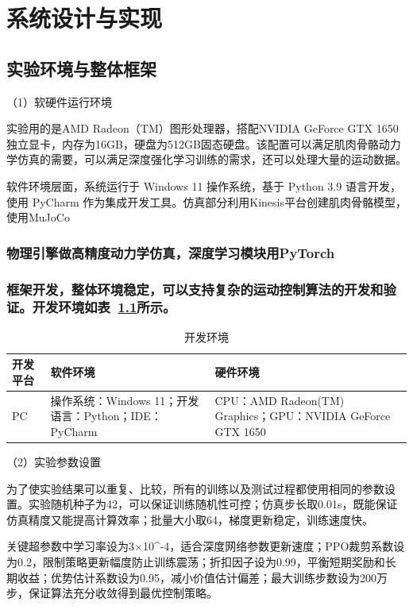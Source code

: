 
\chapter{系统设计与实现}\label{ux7cfbux7edfux8bbeux8ba1ux4e0eux5b9eux73b0}

\section{实验环境与整体框架}\label{ux5b9eux9a8cux73afux5883ux4e0eux6574ux4f53ux6846ux67b6}

（1）软硬件运行环境

实验用的是AMD Radeon（TM）图形处理器，搭配NVIDIA GeForce GTX
1650独立显卡，内存为16GB，硬盘为512GB固态硬盘。该配置可以满足肌肉骨骼动力学仿真的需要，可以满足深度强化学习训练的需求，还可以处理大量的运动数据。

软件环境层面，系统运行于 Windows 11 操作系统，基于 Python 3.9
语言开发，使用 PyCharm
作为集成开发工具。仿真部分利用Kinesis平台创建肌肉骨骼模型，使用MuJoCo
\subsection{物理引擎做高精度动力学仿真，深度学习模块用PyTorch}
\subsection{框架开发，整体环境稳定，可以支持复杂的运动控制算法的开发和验证。开发环境如表~\ref{tab:4-1}所示。}

\begin{table}[htbp]
\centering
\caption{开发环境}
\label{tab:4-1}
\small
\begin{tabularx}{\textwidth}{lXX}
\toprule
开发平台 & 软件环境 & 硬件环境 \\
\midrule
PC & 操作系统：Windows 11；开发语言：Python；IDE：PyCharm & CPU：AMD Radeon(TM) Graphics；GPU：NVIDIA GeForce GTX 1650 \\
\bottomrule
\end{tabularx}
\end{table}

（2）实验参数设置

为了使实验结果可以重复、比较，所有的训练以及测试过程都使用相同的参数设置。实验随机种子为42，可以保证训练随机性可控；仿真步长取0.01s，既能保证仿真精度又能提高计算效率；批量大小取64，梯度更新稳定，训练速度快。

关键超参数中学习率设为3×10\^{}-4，适合深度网络参数更新速度；PPO裁剪系数设为0.2，限制策略更新幅度防止训练震荡；折扣因子设为0.99，平衡短期奖励和长期收益；优势估计系数设为0.95，减小价值估计偏差；最大训练步数设为200万步，保证算法充分收敛得到最优控制策略。

